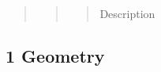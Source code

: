 \documentclass[letterpaper,10pt,english]{sphinxmanual}
\begin{document}
\begin{quote}
\begin{description}
\begin{quote}
\begin{description}
\begin{quote}
\begin{description}
\item[{Description}] \leavevmode
{}

\end{description}\end{quote}

\end{description}\end{quote}

\end{description}\end{quote}


\subsection{1 \textbar{} Geometry}
\label{\detokenize{components:geometry}}
\end{document}
